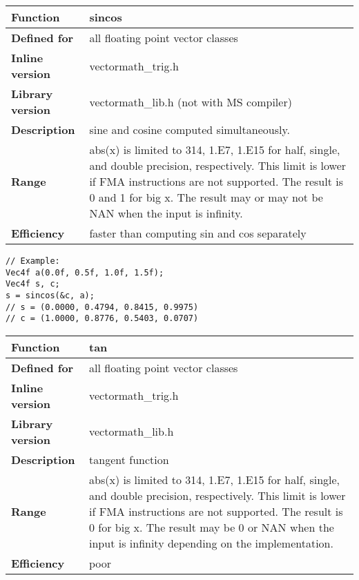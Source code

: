 \documentclass[vcl_manual.tex]{subfiles}
\begin{document}
\begin{tabular}{|p{30mm}|p{120mm}|}
\hline
\bfseries Function & sincos \\ \hline
\bfseries Defined for & all floating point vector classes \\ \hline
\bfseries Inline version & vectormath\_trig.h \\ \hline
\bfseries Library version & vectormath\_lib.h (not with MS compiler) \\ \hline
\bfseries Description & sine and cosine computed simultaneously.\\ \hline
\bfseries Range & abs(x) is limited to 314, 1.E7, 1.E15 for half, single, and double precision, respectively. This limit is lower if FMA instructions are not supported. The result is 0 and 1 for big x. The result may or may not be NAN when the input is infinity. \\ \hline
\bfseries Efficiency & faster than computing sin and cos separately \\ \hline
\end{tabular}
\begin{lstlisting}[frame=none]
// Example:
Vec4f a(0.0f, 0.5f, 1.0f, 1.5f);
Vec4f s, c;
s = sincos(&c, a);
// s = (0.0000, 0.4794, 0.8415, 0.9975)
// c = (1.0000, 0.8776, 0.5403, 0.0707)
\end{lstlisting}


\begin{tabular}{|p{30mm}|p{120mm}|}
\hline
\bfseries Function & tan \\ \hline
\bfseries Defined for & all floating point vector classes \\ \hline
\bfseries Inline version & vectormath\_trig.h \\ \hline
\bfseries Library version & vectormath\_lib.h \\ \hline
\bfseries Description & tangent function \\ \hline
\bfseries Range & abs(x) is limited to 314, 1.E7, 1.E15 for half, single, and double precision, respectively. This limit is lower if FMA instructions are not supported. The result is 0 for big x. The result may be 0 or NAN when the input is infinity depending on the implementation. \\ \hline
\bfseries Efficiency & poor \\ \hline
\end{tabular}
\end{document}
